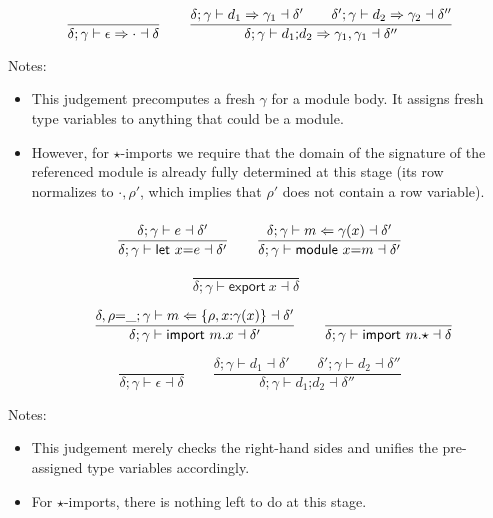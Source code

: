 \documentclass[10pt,a4paper]{article}
\newcommand\K[1]{\ensuremath{\textsf{#1}}}
\newcommand\note[1]{\noindent #1}
\begin{document}
$$
\frac{
}{
  \delta; \gamma \vdash \epsilon \synth {\cdot} \dashv \delta
}
\qquad
\frac{
  \delta; \gamma \vdash d_1 \synth \gamma_1 \dashv \delta'
  \qquad
  \delta'; \gamma \vdash d_2 \synth \gamma_2 \dashv \delta''
}{
  \delta; \gamma \vdash d_1\K;d_2 \synth \gamma_1,\gamma_1 \dashv \delta''
}
$$

\note{
Notes:
\begin{itemize}
\item This judgement precomputes a fresh $\gamma$ for a module body. It assigns fresh type variables to anything that could be a module.
\item However, for $\star$-imports we require that the domain of the signature of the referenced module is already fully determined at this stage (its row normalizes to $\cdot,\rho'$, which implies that $\rho'$ does not contain a row variable).
\end{itemize}
}


\subsubsection*{}

$$
\frac{
  \delta; \gamma \vdash e \dashv \delta'
}{
  \delta; \gamma \vdash \K{let}~x\K=e \dashv \delta'
}
\qquad
\frac{
  \delta; \gamma \vdash m \anal \gamma(x) \dashv \delta'
}{
  \delta; \gamma \vdash \K{module}~x\K=m \dashv \delta'
}
$$

$$
\frac{
}{
  \delta; \gamma \vdash \K{export}~x \dashv \delta
}
\qquad
$$

$$
\qquad
\frac{
  \delta,\rho{=}\_; \gamma \vdash m \anal \{\rho,x{:}\gamma(x)\} \dashv \delta'
}{
  \delta; \gamma \vdash \K{import}~m\K.x \dashv \delta'
}
\qquad
\frac{
}{
  \delta; \gamma \vdash \K{import}~m\K.{\star} \dashv \delta
}
$$

$$
\frac{
}{
  \delta; \gamma \vdash \epsilon \dashv \delta
}
\qquad
\frac{
  \delta; \gamma \vdash d_1 \dashv \delta'
  \qquad
  \delta'; \gamma \vdash d_2 \dashv \delta''
}{
  \delta; \gamma \vdash d_1\K;d_2 \dashv \delta''
}
$$

\note{
Notes:
\begin{itemize}
\item This judgement merely checks the right-hand sides and unifies the pre-assigned type variables accordingly.
\item For $\star$-imports, there is nothing left to do at this stage.
\end{itemize}
}
\end{document}
